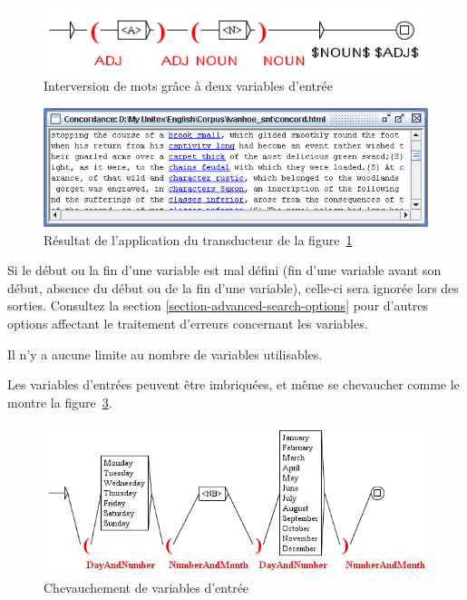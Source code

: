 \begin{figure}[!ht]
\begin{center}
\includegraphics[width=11.3cm]{resources/img/fig6-27.png}
\caption{Interversion de mots grâce à deux variables d'entrée\label{fig-swapping-words}}
\end{center}
\end{figure}

\begin{figure}[!ht]
\begin{center}
\includegraphics[width=13.4cm]{resources/img/fig6-28.png}
\caption{Résultat de l’application du transducteur de la figure~\ref{fig-swapping-words}\label{fig-no-space-problem}}
\end{center}
\end{figure}

\bigskip
\noindent Si le début ou la fin d’une variable est mal défini (fin d’une variable avant son début,
absence du début ou de la fin d’une variable), celle-ci sera ignorée lors des sorties.
Consultez la section \ref{section-advanced-search-options} pour d'autres options affectant
le traitement d'erreurs concernant les variables.

\bigskip
\noindent Il n’y a aucune limite au nombre de variables utilisables.

\bigskip
\noindent    Les variables d'entrées peuvent être imbriquées, et même se chevaucher comme le montre la
figure~\ref{fig-overlapping-variables}.

\begin{figure}[!ht]
\begin{center}
\includegraphics[width=15cm]{resources/img/fig6-29.png}
\caption{Chevauchement de variables d'entrée\label{fig-overlapping-variables}}
\end{center}
\end{figure}

